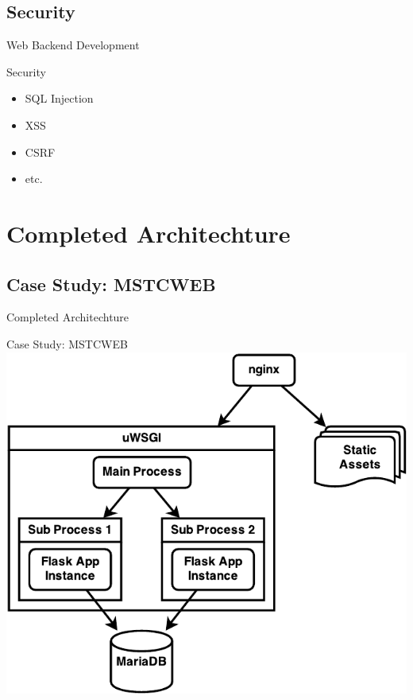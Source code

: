 \documentclass{beamer}
\begin{document}
\subsection{Security}
\begin{frame}{Web Backend Development}
    \begin{block}{Security} \pause
        \begin{itemize}
            \item SQL Injection
            \item XSS
            \item CSRF
            \item etc.
        \end{itemize}
    \end{block}
\end{frame}

\section{Completed Architechture}

\subsection{Case Study: MSTCWEB}
\begin{frame}{Completed Architechture}
    \begin{block}{Case Study: MSTCWEB} \pause
        \center
        \includegraphics[scale=0.6]{mstcweb}
    \end{block}
\end{frame}
\end{document}
